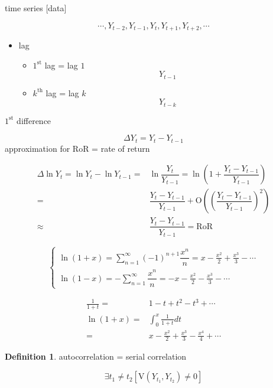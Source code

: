 \documentclass[
]{book}
\providecommand{\tightlist}{%
  \setlength{\itemsep}{0pt}\setlength{\parskip}{0pt}}
\theoremstyle{definition}
\newtheorem{definition}{Definition}[chapter]
\theoremstyle{definition}
\theoremstyle{definition}
\theoremstyle{definition}
\theoremstyle{remark}
\begin{document}
time series {[}data{]}

\[
\cdots,Y_{t-2},Y_{t-1},Y_{t},Y_{t+1},Y_{t+2},\cdots
\]

\begin{itemize}
\tightlist
\item
  lag

  \begin{itemize}
  \tightlist
  \item
    \(1^\text{st}\) lag = lag \(1\)
    \[
    Y_{t-1}
    \]
  \item
    \(k^\text{th}\) lag = lag \(k\)
    \[
    Y_{t-k}
    \]
  \end{itemize}
\end{itemize}

\(1^\text{st}\) difference

\[
\Delta Y_{t}=Y_{t}-Y_{t-1}
\] approximation for RoR = rate of return

\[
\begin{aligned}
\Delta\ln Y_{t}=\ln Y_{t}-\ln Y_{t-1}= & \ln\dfrac{Y_{t}}{Y_{t-1}}=\ln\left(1+\dfrac{Y_{t}-Y_{t-1}}{Y_{t-1}}\right)\\
= & \dfrac{Y_{t}-Y_{t-1}}{Y_{t-1}}+\mathrm{O}\left(\left(\dfrac{Y_{t}-Y_{t-1}}{Y_{t-1}}\right)^{2}\right)\\
\approx & \dfrac{Y_{t}-Y_{t-1}}{Y_{t-1}}=\mathrm{RoR}
\end{aligned}
\]

\[
\begin{cases}
\ln(1+x)=\sum\limits _{n=1}^{\infty}(-1)^{n+1}\dfrac{x^{n}}{n}=x-\frac{x^{2}}{2}+\frac{x^{3}}{3}-\cdots\\
\ln(1-x)=-\sum\limits _{n=1}^{\infty}\dfrac{x^{n}}{n}=-x-\frac{x^{2}}{2}-\frac{x^{3}}{3}-\cdots
\end{cases}
\]

\[
\begin{aligned}
\frac{1}{1+t}= & 1-t+t^{2}-t^{3}+\cdots\\
\ln(1+x)= & \int_{0}^{x}\frac{1}{1+t}dt\\
= & x-\frac{x^{2}}{2}+\frac{x^{3}}{3}-\frac{x^{4}}{4}+\cdots
\end{aligned}
\]

\begin{definition}
\protect\hypertarget{def:unnamed-chunk-1}{}\label{def:unnamed-chunk-1}autocorrelation = serial correlation
\end{definition}

\[
\exists t_{1}\ne t_{2}\left[\mathrm{V}\left(Y_{t_{1}},Y_{t_{2}}\right)\ne0\right]
\]
\end{document}
